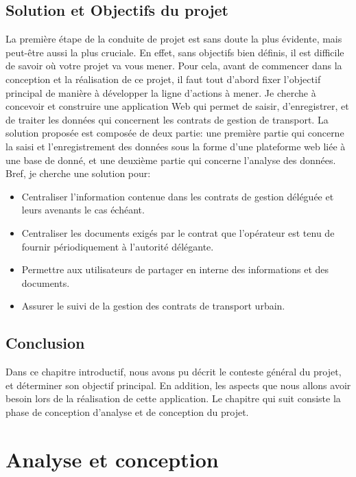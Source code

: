 \documentclass[a4paper]{report}
\begin{document}
\begin{doublespace}
    \section{Solution et Objectifs du projet}
    La première étape de la conduite de projet est sans doute la plus évidente, mais peut-être
    aussi la plus cruciale. En effet, sans objectifs bien définis, il est difficile de savoir où votre projet
    va vous mener. Pour cela, avant de commencer dans la conception et la réalisation de ce projet,
    il faut tout d’abord fixer l’objectif principal de manière à développer la ligne d’actions à mener.
    Je cherche à concevoir et construire une application Web qui permet de saisir, d'enregistrer,
    et de traiter les données qui concernent les contrats de gestion de transport. La
    solution proposée est composée de deux partie: une première partie qui concerne la
    saisi et l'enregistrement des données sous la forme d'une plateforme web liée à une
    base de donné, et une deuxième partie qui concerne l'analyse des données.
    Bref, je cherche une solution pour:
    \begin{itemize}
        \item Centraliser l’information contenue dans les contrats de gestion déléguée et
              leurs avenants le cas échéant.
        \item Centraliser les documents exigés par le contrat que l’opérateur est tenu de
              fournir périodiquement à l’autorité délégante.
        \item Permettre aux utilisateurs de partager en interne des informations et des
              documents.
        \item Assurer le suivi de la gestion des contrats de transport urbain.
    \end{itemize}
    \newpage
    \section{Conclusion}
    Dans ce chapitre introductif, nous avons pu décrit le conteste général du projet, et
    déterminer son objectif principal. En addition, les aspects que nous allons
    avoir besoin lors de la réalisation de cette application.
    Le chapitre qui suit consiste la phase de conception d'analyse et de conception du projet.
    \newpage
    \chapter{Analyse et conception}


\end{doublespace}
\end{document}
